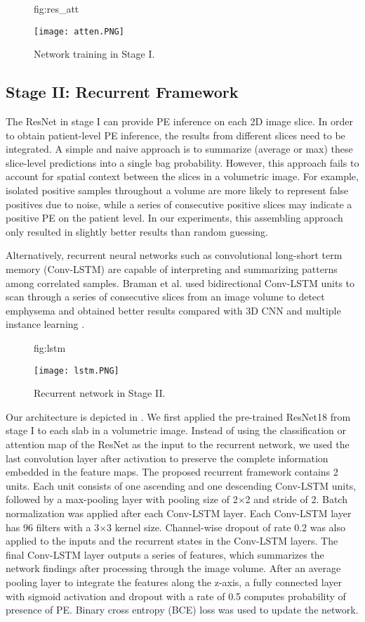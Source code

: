 \documentclass{midl} %
\begin{document}
\begin{figure}[htbp]
\floatconts
  {fig:res_att}
  {\caption{Network training in Stage I.}}
  {\texttt{[image: atten.PNG]}}
\end{figure}

\subsection{Stage II: Recurrent Framework}
\label{ssec:stage2}

The ResNet in stage I can provide PE inference on each 2D image slice. In order to obtain patient-level PE inference, the results from different slices need to be integrated. A simple and naive approach is to summarize (average or max) these slice-level predictions into a single bag probability. However, this approach fails to account for spatial context between the slices in a volumetric image. For example, isolated positive samples throughout a volume are more likely to represent false positives due to noise, while a series of consecutive positive slices may indicate a positive PE on the patient level. In our experiments, this assembling approach only resulted in slightly better results than random guessing.

Alternatively, recurrent neural networks such as convolutional long-short term memory (Conv-LSTM) \cite{xingjian2015convolutional} are capable of interpreting and summarizing patterns among correlated samples. Braman et al. used bidirectional Conv-LSTM units to scan through a series of consecutive slices from an image volume to detect emphysema and obtained better results compared with 3D CNN and multiple instance learning \cite{braman2018disease}.

\begin{figure}[htbp]
\floatconts
  {fig:lstm}
  {\caption{Recurrent network in Stage II.}}
  {\texttt{[image: lstm.PNG]}}
\end{figure}

Our architecture is depicted in . We first applied the pre-trained ResNet18 from stage I to each slab in a volumetric image. Instead of using the classification or attention map of the ResNet  as the input to the recurrent network, we used the last convolution layer after activation to preserve the complete information embedded in the feature maps. The proposed recurrent framework contains 2 units. Each unit consists of one ascending and one descending Conv-LSTM units, followed by a max-pooling layer with pooling size of 2$\times$2 and stride of 2. Batch normalization was applied after each Conv-LSTM layer. Each Conv-LSTM layer has 96 filters with a 3$\times$3 kernel size. Channel-wise dropout of rate 0.2 was also applied to the inputs and the recurrent states in the Conv-LSTM layers. The final Conv-LSTM layer outputs a series of features, which summarizes the network findings after processing through the image volume. After an average pooling layer to integrate the features along the z-axis, a fully connected layer with sigmoid activation and dropout with a rate of 0.5 computes probability of presence of PE. Binary cross entropy (BCE) loss was used to update the network.
\end{document}
